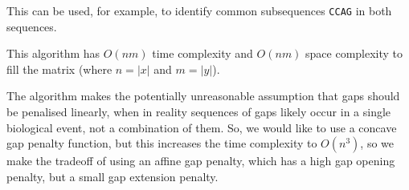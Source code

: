 This can be used, for example, to identify common subsequences \texttt{CCAG} in both sequences.

This algorithm has $O(nm)$ time complexity and $O(nm)$ space complexity to fill the matrix (where $n = |x|$ and $m = |y|$).

The algorithm makes the potentially unreasonable assumption that gaps should be penalised linearly, when in reality sequences of gaps likely occur in a single biological event, not a combination of them. So, we would like to use a concave gap penalty function, but this increases the time complexity to $O(n^3)$, so we make the tradeoff of using an affine gap penalty, which has a high gap opening penalty, but a small gap extension penalty.







